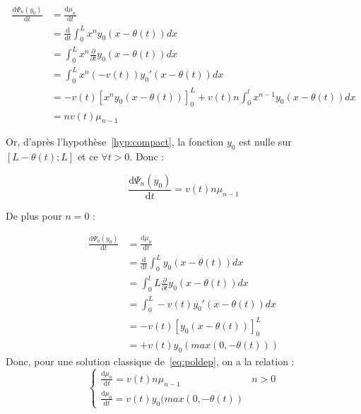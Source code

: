 \documentclass[a4paper]{article}
\begin{document}
\[
\begin{split}
	\frac{\mathrm{d} \Psi_n (y_0) }{\mathrm{d}t} &= \frac{\mathrm{d} \mu_n }{\mathrm{d}t} \\
                                                 &= \frac{\mathrm{d}}{\mathrm{d}t}\int_0^L x^n y_0(x-\theta(t)) dx \\
	                                             &= \int_0^L x^n \frac{\partial}{\partial t}y_0(x-\theta(t)) dx \\
												 &= \int_0^L x^n (-v(t))y_0'(x-\theta(t)) dx \\
												 &= -v(t)[x^n y_0(x-\theta(t))]_0^L + v(t) n \int_0^l x^{n-1} y_0(x-\theta(t)) dx\\
												 &= n v(t) \mu_{n-1}
\end{split}
\]

Or, d'après l'hypothèse~\eqref{hyp:compact}, la fonction $y_0$ est nulle sur $[L-\theta(t);L]$ et ce $\forall t >0$. Donc :

\[\frac{\mathrm{d} \Psi_n (y_0) }{\mathrm{d}t}= v(t) n \mu_{n-1}\]

De plus pour $n=0$ :

\[ 
\begin{split}
\frac{\mathrm{d} \Psi_0 (y_0) }{\mathrm{d}t} &= \frac{\mathrm{d} \mu_0 }{\mathrm{d}t} \\
                                             &= \frac{\mathrm{d}}{\mathrm{d}t}\int_0^L y_0(x-\theta(t)) dx \\
	                                         &= \int_0^lL\frac{\partial}{\partial t}y_0(x-\theta(t)) dx \\
											 &= \int_0^L -v(t)y_0'(x-\theta(t)) dx \\
											 &= -v(t)[y_0(x-\theta(t))]_0^L  \\
											 &= + v(t) y_0(max(0,-\theta(t))) 
\end{split}
\]
Donc, pour une solution classique de~\eqref{eq:poldep}, on a la relation : 
\begin{equation}
	\label{eq:mmt}
\begin{cases}
\displaystyle \frac{\mathrm{d} \mu_n }{\mathrm{d}t} = v(t) n \mu_{n-1} & n>0 \\
\displaystyle \frac{\mathrm{d} \mu_0 }{\mathrm{d}t} = v(t) y_0(max(0,-\theta(t))
\end{cases}
\end{equation}
\end{document}
